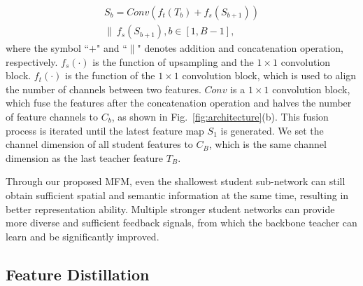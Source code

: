 \documentclass[letterpaper]{article} %
\begin{document}
\begin{equation}
\begin{aligned}
S_{b}= Conv(f_{t}(T_{b})+ f_{s}(S_{b+1})) \\ \parallel  ~f_{s}(S_{b+1}), b \in [1, B-1],
\end{aligned}
\end{equation}
where the symbol ``$+$" and ``$\parallel$" denotes addition and concatenation operation, respectively. $f_{s}(\cdot)$ is the function of upsampling and the $1\times1$ convolution block. $f_{t}(\cdot)$ is the function of the $1\times1$ convolution block, which is used to align the number of channels between two features.
$Conv$ is a $1\times1$ convolution block, which fuse the features after the concatenation operation and halves the number of feature channels to $C_{b}$, as shown in Fig.~\ref{fig:architecture}(b). This fusion process is iterated until the latest feature map $S_{1}$ is generated. 
We set the channel dimension of all student features to $C_{B}$, which is the same channel dimension as the last teacher feature $T_{B}$.

Through our proposed MFM, even the shallowest student sub-network can still obtain sufficient spatial and semantic information at the same time, resulting in better representation ability.
Multiple stronger student networks can provide more diverse and sufficient feedback signals, from which the backbone teacher can learn and be significantly improved.



\subsection{Feature Distillation}
\end{document}
